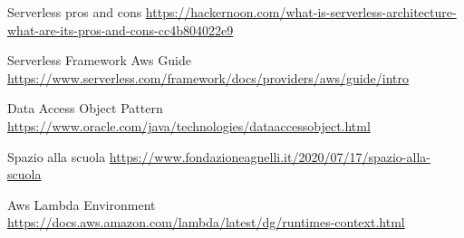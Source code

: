 \begin{thebibliography}{9}
     Serverless pros and cons
    \url{https://hackernoon.com/what-is-serverless-architecture-what-are-its-pros-and-cons-cc4b804022e9}

     Serverless Framework Aws Guide
    \url{https://www.serverless.com/framework/docs/providers/aws/guide/intro}

     Data Access Object Pattern
    \url{https://www.oracle.com/java/technologies/dataaccessobject.html}

     Spazio alla scuola
    \url{https://www.fondazioneagnelli.it/2020/07/17/spazio-alla-scuola}

     Aws Lambda Environment
    \url{https://docs.aws.amazon.com/lambda/latest/dg/runtimes-context.html}

\end{thebibliography}
